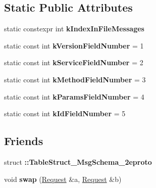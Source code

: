 \subsection*{Static Public Attributes}
\begin{DoxyCompactItemize}
\item 
static constexpr int {\bfseries k\+Index\+In\+File\+Messages}
\item 
\mbox{\label{classcoappbrpc_1_1Request_a6b131649a4743ce2e4d49c760c872d9a}} 
static const int {\bfseries k\+Version\+Field\+Number} = 1
\item 
\mbox{\label{classcoappbrpc_1_1Request_a99a19c8f4f9a2a2a336205fc58054ff7}} 
static const int {\bfseries k\+Service\+Field\+Number} = 2
\item 
\mbox{\label{classcoappbrpc_1_1Request_a3a65833e8c31413fcfd80a10762aa42a}} 
static const int {\bfseries k\+Method\+Field\+Number} = 3
\item 
\mbox{\label{classcoappbrpc_1_1Request_a47ecf8c271e621d08fa508e7364a19dd}} 
static const int {\bfseries k\+Params\+Field\+Number} = 4
\item 
\mbox{\label{classcoappbrpc_1_1Request_aa3808ae5825a8d4b9bfd587b63db6325}} 
static const int {\bfseries k\+Id\+Field\+Number} = 5
\end{DoxyCompactItemize}
\subsection*{Friends}
\begin{DoxyCompactItemize}
\item 
\mbox{\label{classcoappbrpc_1_1Request_a65c087bf06ded9c9be363691f7b7bafa}} 
struct {\bfseries \+::\+Table\+Struct\+\_\+\+Msg\+Schema\+\_\+2eproto}
\item 
\mbox{\label{classcoappbrpc_1_1Request_ad4e2154e85b9878aaaf70f5f9afde893}} 
void {\bfseries swap} (\hyperlink{classcoappbrpc_1_1Request}{Request} \&a, \hyperlink{classcoappbrpc_1_1Request}{Request} \&b)
\end{DoxyCompactItemize}


